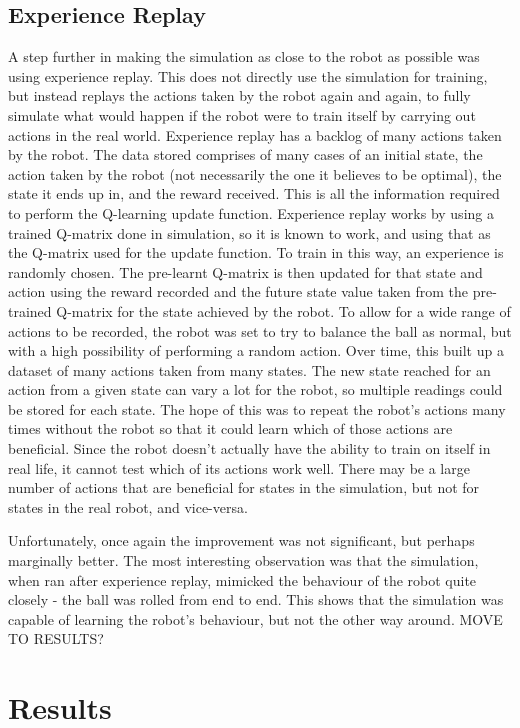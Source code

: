\documentclass[12pt,a4paper]{article}
\begin{document}
\subsection{Experience Replay}
A step further in making the simulation as close to the robot as possible was using experience replay. This does not directly use the simulation for training, but instead replays the actions taken by the robot again and again, to fully simulate what would happen if the robot were to train itself by carrying out actions in the real world. Experience replay has a backlog of many actions taken by the robot. The data stored comprises of many cases of an initial state, the action taken by the robot (not necessarily the one it believes to be optimal), the state it ends up in, and the reward received. This is all the information required to perform the Q-learning update function. Experience replay works by using a trained Q-matrix done in simulation, so it is known to work, and using that as the Q-matrix used for the update function. To train in this way, an experience is randomly chosen. The pre-learnt Q-matrix is then updated for that state and action using the reward recorded and the future state value taken from the pre-trained Q-matrix for the state achieved by the robot. To allow for a wide range of actions to be recorded, the robot was set to try to balance the ball as normal, but with a high possibility of performing a random action. Over time, this built up a dataset of many actions taken from many states. The new state reached for an action from a given state can vary a lot for the robot, so multiple readings could be stored for each state. The hope of this was to repeat the robot's actions many times without the robot so that it could learn which of those actions are beneficial. Since the robot doesn't actually have the ability to train on itself in real life, it cannot test which of its actions work well. There may be a large number of actions that are beneficial for states in the simulation, but not for states in the real robot, and vice-versa. 

Unfortunately, once again the improvement was not significant, but perhaps marginally better. The most interesting observation was that the simulation, when ran after experience replay, mimicked the behaviour of the robot quite closely - the ball was rolled from end to end. This shows that the simulation was capable of learning the robot's behaviour, but not the other way around. MOVE TO RESULTS?

\section{Results}
\end{document}
